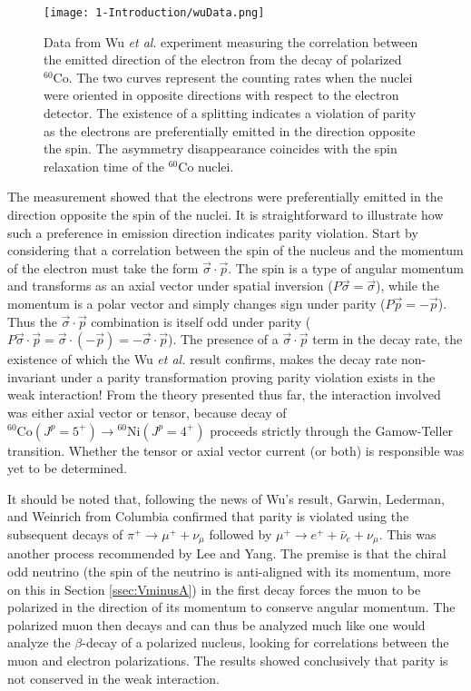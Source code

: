\begin{figure}[h]
  \centering
  \texttt{[image: 1-Introduction/wuData.png]}  
  \caption{Data from Wu \textit{et al}. experiment \cite{wu1957} measuring the correlation between the emitted
    direction of the electron from the decay of polarized $^{60}\mathrm{Co}$. The two
    curves represent the counting rates when the nuclei were oriented in opposite
    directions with respect to the electron detector. The existence of a splitting
    indicates a violation of parity as the electrons are preferentially emitted in the
    direction opposite the spin. The asymmetry disappearance coincides with the spin relaxation time
    of the $^{60}\mathrm{Co}$ nuclei.}
  \label{fig:wuData}
\end{figure}

The measurement showed that the electrons were preferentially
emitted in the direction opposite the spin of the nuclei. It is straightforward to illustrate
how such a preference in emission direction indicates parity violation. Start by considering that
a correlation between the spin of the nucleus and the momentum of the electron
must take the form $\vec{\sigma} \cdot \vec{p}$.
The spin is a type of angular momentum and transforms as an axial vector under spatial inversion
($P\vec{\sigma}=\vec{\sigma}$), while the momentum is a polar vector and
simply changes sign under parity ($P\vec{p}=-\vec{p}$). Thus the $\vec{\sigma} \cdot \vec{p}$
combination is itself odd under parity ($P\vec{\sigma} \cdot \vec{p} = \vec{\sigma} \cdot (-\vec{p}) = -\vec{\sigma} \cdot \vec{p}$).
The presence of
a $\vec{\sigma} \cdot \vec{p}$ term in the decay rate, the existence of which the Wu \textit{et al.} result confirms,
makes the
decay rate non-invariant under a parity transformation proving parity violation exists in the weak interaction!
From the theory presented thus far,
the interaction involved was either axial vector or tensor, because decay of
$^{60}\mathrm{Co} (J^p=5^+) \rightarrow {^{60}\mathrm{Ni}}(J^p=4^+)$ proceeds strictly through
the Gamow-Teller transition. Whether the tensor or axial vector current (or both) is responsible
was yet to be determined.

It should be noted that, following the news of Wu's result, Garwin, Lederman, and
Weinrich \cite{garwin1957} from Columbia confirmed
that parity is violated using the subsequent decays of $\pi^+ \rightarrow \mu^++\nu_\mu$
followed by $\mu^+ \rightarrow e^+ + \bar{\nu}_e + \nu_\mu$. This was another process
recommended by Lee and Yang. The premise is that the chiral odd neutrino (the spin of the neutrino
is anti-aligned with its momentum, more on this in Section \ref{ssec:VminusA}) in the first decay
forces the muon to be polarized in the direction of its momentum to conserve angular
momentum. The polarized muon then decays and can thus be analyzed much like one would analyze the
$\beta$-decay of a polarized nucleus, looking for correlations between the muon and
electron polarizations. The results showed conclusively that parity is not conserved in the weak
interaction.

